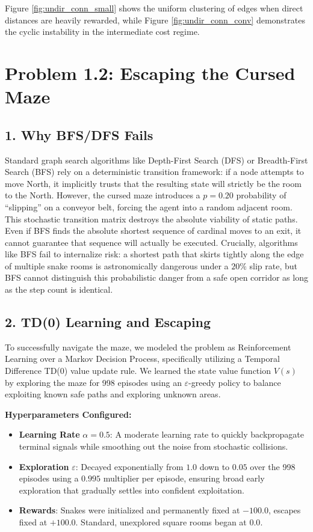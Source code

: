 \documentclass{article}
\begin{document}
Figure \ref{fig:undir_conn_small} shows the uniform clustering of edges when direct distances are heavily rewarded, while Figure \ref{fig:undir_conn_conv} demonstrates the cyclic instability in the intermediate cost regime.

\newpage
\section*{Problem 1.2: Escaping the Cursed Maze}

\subsection*{1. Why BFS/DFS Fails}
Standard graph search algorithms like Depth-First Search (DFS) or Breadth-First Search (BFS) rely on a deterministic transition framework: if a node attempts to move North, it implicitly trusts that the resulting state will strictly be the room to the North. However, the cursed maze introduces a $p=0.20$ probability of ``slipping'' on a conveyor belt, forcing the agent into a random adjacent room. This stochastic transition matrix destroys the absolute viability of static paths. Even if BFS finds the absolute shortest sequence of cardinal moves to an exit, it cannot guarantee that sequence will actually be executed. Crucially, algorithms like BFS fail to internalize risk: a shortest path that skirts tightly along the edge of multiple snake rooms is astronomically dangerous under a $20\%$ slip rate, but BFS cannot distinguish this probabilistic danger from a safe open corridor as long as the step count is identical.

\subsection*{2. TD(0) Learning and Escaping}
To successfully navigate the maze, we modeled the problem as Reinforcement Learning over a Markov Decision Process, specifically utilizing a Temporal Difference TD(0) value update rule. We learned the state value function $V(s)$ by exploring the maze for 998 episodes using an $\varepsilon$-greedy policy to balance exploiting known safe paths and exploring unknown areas.

\textbf{Hyperparameters Configured:}
\begin{itemize}
    \item \textbf{Learning Rate} $\alpha = 0.5$: A moderate learning rate to quickly backpropagate terminal signals while smoothing out the noise from stochastic collisions.
    \item \textbf{Exploration} $\varepsilon$: Decayed exponentially from $1.0$ down to $0.05$ over the 998 episodes using a $0.995$ multiplier per episode, ensuring broad early exploration that gradually settles into confident exploitation.
    \item \textbf{Rewards}: Snakes were initialized and permanently fixed at $-100.0$, escapes fixed at $+100.0$. Standard, unexplored square rooms began at $0.0$.
\end{itemize}
\end{document}
